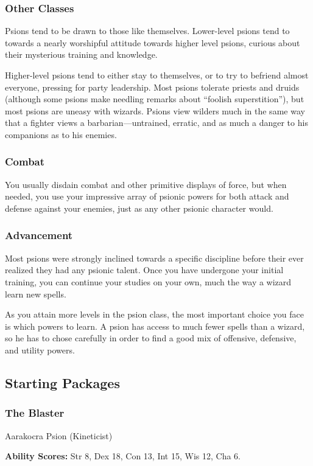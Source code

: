 \subsubsection{Other Classes}
Psions tend to be drawn to those like themselves. Lower-level psions tend to towards a nearly worshipful attitude towards higher level psions, curious about their mysterious training and knowledge.

Higher-level psions tend to either stay to themselves, or to try to befriend almost everyone, pressing for party leadership. Most psions tolerate priests and druids (although some psions make needling remarks about ``foolish superstition''), but most psions are uneasy with wizards. Psions view wilders much in the same way that a fighter views a barbarian---untrained, erratic, and as much a danger to his companions as to his enemies.

\subsubsection{Combat}
You usually disdain combat and other primitive displays of force, but when needed, you use your impressive array of psionic powers for both attack and defense against your enemies, just as any other psionic character would.

\subsubsection{Advancement}
Most psions were strongly inclined towards a specific discipline before their ever realized they had any psionic talent. Once you have undergone your initial training, you can continue your studies on your own, much the way a wizard learn new spells.

As you attain more levels in the psion class, the most important choice you face is which powers to learn. A psion has access to much fewer spells than a wizard, so he has to chose carefully in order to find a good mix of offensive, defensive, and utility powers.

\subsection{Starting Packages}
\subsubsection{The Blaster}
Aarakocra Psion (Kineticist)

\textbf{Ability Scores:} Str 8, Dex 18, Con 13, Int 15, Wis 12, Cha 6.

